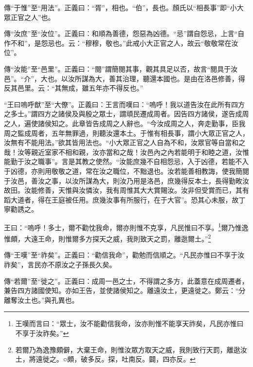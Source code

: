{\noindent\zhuan{}\fzbyks 傳“于惟”至“用法”。正義曰：“胥”，相也。“伯”，長也。顏氏以“相長事”即“小大眾正官之人”也。 \par}

{\noindent\zhuan{}\fzbyks 傳“汝庶”至“汝位”。正義曰：和順為善德，怨惡為凶德。“忌”謂自怨忌，上言“自作不和”，是怨忌也。云：“穆穆，敬也。”此戒小大正官之人，故云“敬敬常在汝位”。 \par}

{\noindent\zhuan{}\fzbyks 傳“汝能”至“邑里”。正義曰：“閱”謂簡閱其事，觀其具足以否，故言“閱具于汝邑”。“介”，大也。以汝所謀為大，善其治理，聽還本國也。是由在洛邑修善，得反其邑里。云：“其無成，雖五年亦不得反也。” \par}

{\noindent\shu{}\fzkt “王曰嗚呼猷”至“大僚”。正義曰：王言而嘆曰：“嗚呼！我以道告汝在此所有四方之多士。”謂四方之諸侯及與殷之眾士，謂頑民遷成周者。因告四方諸侯，遂告成周之人，遍使諸侯知之。此章皆告成周之人辭也。“今汝成周之人，奔走勤事，臣我周之監成周者，五年無罪過，則聽汝還本土。于惟有相長事，謂小大眾正官之人，汝無有不能用法。”欲其皆用法也。“小大眾正官之人自為不和，汝眾官等自當和之哉！汝等親近室家不相和親，汝亦當和之哉！汝邑內之內若能明于和睦之道，汝惟能勤于汝之職事”。言是其教之使然。“汝能庶幾不自相怨忌，入于凶德，若能不入于凶德，亦則用敬敬之道，常在汝之職位，不黜退也。汝若能善相教誨，使我簡閱于汝邑，善汝之事，以汝所謀為大，則汝乃用是洛邑，庶幾得反本土，長得勤畋汝故田。汝能修善，天惟與汝憐汝，我有周惟其大大賞賜汝。汝非但受賞而已，其有蹈大道者，得在王庭被任用。庶幾汝事有所服行，在于大官”。恐其心未服，故丁寧勸誘之。 \par}

王曰：“嗚呼！多士，爾不勸忱我命，爾亦則惟不克享，凡民惟曰不享。\footnote{王嘆而言曰：“眾士，汝不能勸信我命，汝亦則惟不能享天祚矣，凡民亦惟曰不享于汝祚矣。”}爾乃惟逸惟頗，大遠王命，則惟爾多方探天之威，我則致天之罰，離逖爾土。”\footnote{若爾乃為逸豫頗僻，大棄王命，則惟汝眾方取天之威，我則致行天罰，離逖汝土，將遠徙之。○頗，破多反。探，吐南反。闢，四亦反。}


{\noindent\zhuan{}\fzbyks 傳“王嘆”至“祚矣”。正義曰：“勸信我命”，勸勉而信順之。“凡民亦惟曰不享于汝祚矣”，言民亦不原汝之子孫長久矣。 \par}

{\noindent\zhuan{}\fzbyks 傳“若爾”至“徙之”。正義曰：成周一邑之士，不得謂之多方，此蓋意在成周遷者，兼告四方諸國使知。亦如王告，並使諸侯知之。離遠汝土，更遠徙之。鄭云：“分離奪汝土也。”與孔異也。 \par}

